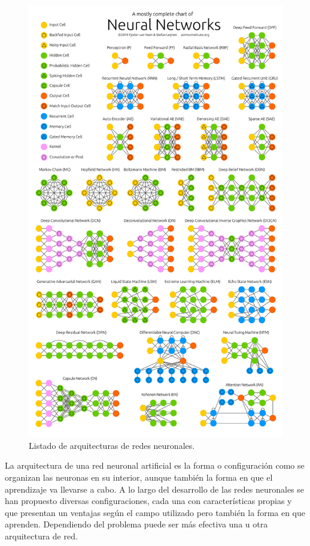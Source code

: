             \begin{figure}[ht!]
            	\centering
            	\includegraphics[width=0.8\linewidth]{imgs/02-Referential/02-NNZoo2019.png}
            	\caption[Listado de arquitecturas de redes neuronales]{Listado de arquitecturas de redes neuronales.}
        	    \label{fig:NNZoo2019}
            \end{figure}%
            
            La arquitectura de una red neuronal artificial es la forma o configuración como se organizan las neuronas en su interior, aunque también la forma en que el aprendizaje va llevarse a cabo. A lo largo del desarrollo de las redes neuronales se han propuesto diversas configuraciones, cada una con características propias y que presentan un ventajas según el campo utilizado pero también la forma en que aprenden. Dependiendo del problema puede ser más efectiva una u otra arquitectura de red. 
            
